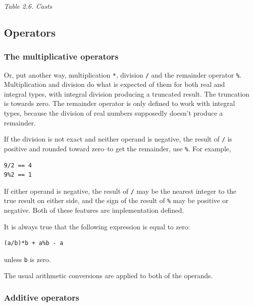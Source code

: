 \begin{center}\textit{Table 2.6. Casts}\end{center}


   

  

  \subsection{Operators}
   

   \subsubsection{The multiplicative operators}
    

    Or, put another way, multiplication \texttt{*},
     division \texttt{/} and the remainder
     operator \texttt{\%}. Multiplication and division do what is
     expected of them for both real and integral types, with integral division
     producing a truncated result. The truncation is towards zero. The
     remainder operator is only defined to work with integral types, because
     the division of real numbers supposedly doesn't produce a remainder.


    If the division is not exact and neither operand is negative, the
     result of \texttt{/} is positive and rounded toward zero--to
     get the remainder, use \texttt{\%}. For example,


    \begin{Verbatim}
9/2 == 4
9%2 == 1
\end{Verbatim}

    If either operand is negative, the result of \texttt{/} may be
     the nearest integer to the true result on either side, and the sign of
     the result of \texttt{\%} may be positive or negative. Both of
     these features are implementation defined.


    It is always true that the following expression is equal to zero:


    \begin{Verbatim}
(a/b)*b + a%b - a
\end{Verbatim}

    unless \texttt{b} is zero.


    The usual arithmetic conversions are applied to both of the
     operands.


   

   \subsubsection{Additive operators}
    

